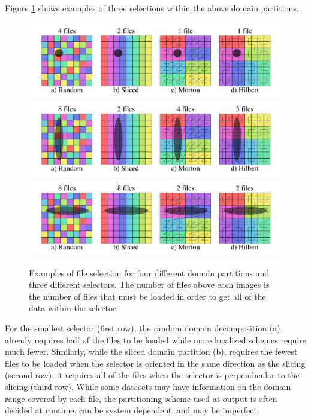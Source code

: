 \documentclass[apjl]{emulateapj}
\begin{document}
Figure \ref{fig:selectors} shows examples of three selections within the above domain partitions. 
%
\begin{figure}[htbp]
\begin{center}
\includegraphics[width=\columnwidth,keepaspectratio]{../images/selector1.png}
\includegraphics[width=\columnwidth,keepaspectratio]{../images/selector5.png}
\includegraphics[width=\columnwidth,keepaspectratio]{../images/selector4.png}
\caption{Examples of file selection for four different domain partitions and three different selectors. The number of files above each images is the number of files that must be loaded in order to get all of the data within the selector.}
\label{fig:selectors}
\end{center}
\end{figure}
%
For the smallest selector (first row), the random domain decomposition (a) already requires half of the files to be loaded while more localized schemes require much fewer. Similarly, while the sliced domain partition (b), requires the fewest files to be loaded when the selector is oriented in the same direction as the slicing (second row), it requires all of the files when the selector is perpendicular to the slicing (third row). While some datasets may have information on the domain range covered by each file, the partitioning scheme used at output is often decided at runtime, can be system dependent, and may be imperfect. 
\end{document}
